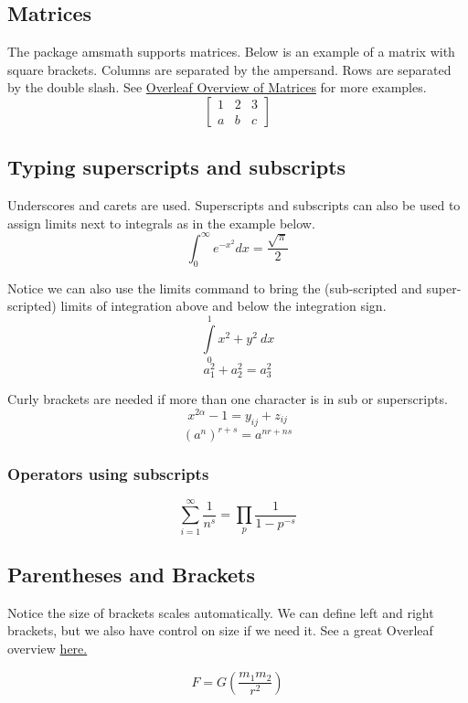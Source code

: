 \documentclass{article}
\begin{document}
\subsection{Matrices}
The package amsmath supports matrices.  Below is an example of a matrix with square brackets.  Columns are separated by the ampersand.  Rows are separated by the double slash.  See \href{https://www.overleaf.com/learn/latex/Matrices}{Overleaf Overview of Matrices} for more examples.
\begin{equation}
\begin{bmatrix}
1 & 2 & 3\\
a & b & c
\end{bmatrix}
\end{equation}

\subsection{Typing superscripts and subscripts}
Underscores and carets are used.  
Superscripts and subscripts can also be used to assign limits next to integrals as in the example below.
\begin{equation*}
    \int_0^\infty e^{-x^2} dx=\frac{\sqrt{\pi}}{2}
\end{equation*}

Notice we can also use the limits command to bring the (sub-scripted and super-scripted) limits of integration above and below the integration sign.
\[ \int\limits_0^1 x^2 + y^2 \ dx \]
\[ a_1^2 + a_2^2 = a_3^2 \]

Curly brackets are needed if more than one character is in sub or superscripts.
\[ x^{2 \alpha} - 1 = y_{ij} + z_{ij}  \]
\[ (a^n)^{r+s} = a^{nr+ns}  \]

\subsubsection{Operators using subscripts}
\[ \sum_{i=1}^{\infty} \frac{1}{n^s} 
= \prod_p \frac{1}{1 - p^{-s}} \]

\subsection{Parentheses and Brackets}
Notice the size of brackets scales automatically.  We can define left and right brackets, but we also have control on size if we need it.  See a great Overleaf overview \href{https://www.overleaf.com/learn/latex/Brackets_and_Parentheses}{here.}

\[ F = G \left( \frac{m_1 m_2}{r^2} \right) \]
\end{document}
